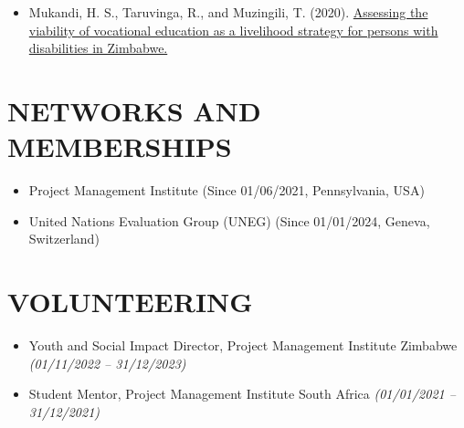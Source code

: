 \documentclass[
  10pt,
]{article}
\providecommand{\tightlist}{%
  \setlength{\itemsep}{0pt}\setlength{\parskip}{0pt}}
\begin{document}
\begin{itemize}
\tightlist
\item
  Mukandi, H. S., Taruvinga, R., and Muzingili, T. (2020).
  \href{https://catalogue.leidenuniv.nl/permalink/31UKB_LEU/s5ab2f/alma9939992501102711}{Assessing
  the viability of vocational education as a livelihood strategy for
  persons with disabilities in Zimbabwe.}
\end{itemize}

\vspace{0.5cm}

\section{NETWORKS AND MEMBERSHIPS}\label{networks-and-memberships}

\begin{itemize}[itemsep=0.25em, topsep=0.25em]
  \item Project Management Institute (Since 01/06/2021, Pennsylvania, USA)  
  \item United Nations Evaluation Group (UNEG) (Since 01/01/2024, Geneva, Switzerland)
\end{itemize}

\vspace{0.5cm}

\section{VOLUNTEERING}\label{volunteering}

\begin{itemize}[itemsep=0.25em, topsep=0.25em]
  \item Youth and Social Impact Director, Project Management Institute Zimbabwe \textit{(01/11/2022 – 31/12/2023)}
  \item Student Mentor, Project Management Institute South Africa \textit{(01/01/2021 – 31/12/2021)}
\end{itemize}
\end{document}
